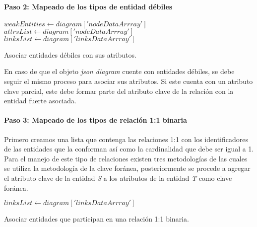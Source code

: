 \paragraph*{Paso 2: Mapeado de los tipos de entidad débiles}

\begin{algorithm}[H]

  $weakEntities \gets diagram['nodeDataArrray']$\\
  $attrsList \gets diagram['nodeDataArrray']$\\
  $linksList \gets diagram['linksDataArrray']$\\
   {
  }
  \caption{Asociar entidades débiles con sus atributos.}
\end{algorithm}

En caso de que el objeto \textit{json diagram} cuente con entidades débiles, se debe seguir el mismo proceso para asociar sus atributos. Si este cuenta con un atributo clave parcial, este debe formar parte del atributo clave de la relación con la entidad fuerte asociada.

\paragraph*{Paso 3: Mapeado de los tipos de relación 1:1 binaria}

Primero creamos una lista que contenga las relaciones 1:1 con los identificadores de las entidades que la conforman así como la cardinalidad que debe ser igual a 1. Para el manejo de este tipo de relaciones existen tres metodologías de las cuales se utiliza la metodología de la clave foránea, posteriormente se procede a agregar el atributo clave de la entidad \textit{S} a los atributos de la entidad \textit{T} como clave foránea. 

\begin{algorithm}[H]

  $linksList \gets diagram['linksDataArrray']$\\
  \caption{Asociar entidades que participan en una relación 1:1 binaria.}
\end{algorithm}

